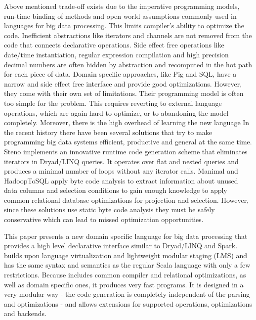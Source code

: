 Above mentioned trade-off exists due to the imperative programming models, run-time binding of methods and open world assumptions commonly used in languages for big data processing. This limits compiler's ability to optimize the code. Inefficient abstractions like iterators and channels are not removed from the code that connects declarative operations. Side effect free operations like date/time instantiation, regular expression compilation and high precision decimal numbers are often hidden by abstraction and recomputed in the hot path for each piece of data. Domain specific approaches, like Pig and SQL, have a narrow and side effect free interface and provide good optimizations. However, they come with their own set of limitations. Their programming model is often too simple for the problem. This requires reverting to external language operations, which are again hard to optimize, or to abandoning the model completely. Moreover, there is the high overhead of learning the new language 
In the recent history there have been several solutions that try to make programming big data systems efficient, productive and general at the same time. Steno \cite{murray_steno:_2011} implements an innovative runtime code generation scheme that eliminates iterators in Dryad/LINQ queries. It operates over flat and nested queries and produces a minimal number of loops without any iterator calls. Manimal \cite{jahani_automatic_2011} and HadoopToSQL \cite{iu_hadooptosql:_2010} apply byte code analysis to extract information about unused data columns and selection conditions to gain enough knowledge to apply common relational database optimizations for projection and selection. However, since these solutions use static byte code analysis they must be safely conservative which can lead to missed optimization opportunities.

This paper presents a new domain specific language \tool for big data processing that provides a high level declarative interface similar to Dryad/LINQ and Spark. \tool builds upon language virtualization \cite{moors_scala-virtualized_2012} and lightweight modular staging \cite{rompf_lightweight_2010} (LMS) and has the same syntax and semantics as the regular Scala language with only a few restrictions.
Because \tool includes common compiler and relational optimizations, as well as domain specific ones, it produces very fast programs. It is designed in a very modular way - the code generation is completely independent of the parsing and optimizations - and allows extensions for supported operations, optimizations and backends. 

